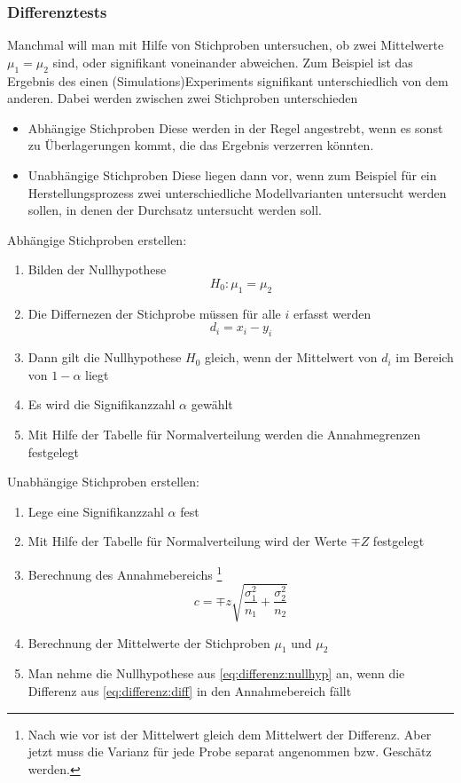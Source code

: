 \subsubsection{Differenztests}
Manchmal will man mit Hilfe von Stichproben untersuchen, ob  zwei Mittelwerte $\mu_1 = \mu_2$ sind, oder signifikant voneinander abweichen. Zum Beispiel ist das Ergebnis des einen (Simulations)Experiments signifikant unterschiedlich von dem anderen.  Dabei werden zwischen zwei Stichproben unterschieden
\begin{itemize}
\item Abhängige Stichproben
\subitem Diese werden in der Regel angestrebt, wenn es sonst zu Überlagerungen kommt, die das Ergebnis verzerren könnten.
\item Unabhängige Stichproben
\subitem Diese liegen dann vor, wenn zum Beispiel für ein Herstellungsprozess zwei unterschiedliche Modellvarianten untersucht werden sollen, in denen der Durchsatz untersucht werden soll.
\end{itemize}
Abhängige Stichproben erstellen:
\begin{enumerate}
\item Bilden der Nullhypothese
\begin{equation}\label{eq:differenz:nullhyp}
H_0: \mu_1 = \mu_2
\end{equation}
\item Die Differnezen der Stichprobe müssen für alle $i$ erfasst werden
\begin{equation}\label{eq:differenz:diff}
d_i = x_i - y_i
\end{equation}
\item Dann gilt die Nullhypothese $H_0$ gleich, wenn der Mittelwert von $d_i$ im Bereich von $1-\alpha$ liegt
\item Es wird die Signifikanzzahl $\alpha$ gewählt
\item Mit Hilfe der Tabelle für Normalverteilung werden die Annahmegrenzen festgelegt
\end{enumerate}
Unabhängige Stichproben erstellen:
\begin{enumerate}
\item Lege eine Signifikanzzahl $\alpha$ fest
\item Mit Hilfe der Tabelle für Normalverteilung wird der Werte $\mp Z$ festgelegt
\item Berechnung des Annahmebereichs
\footnote{Nach wie vor ist der Mittelwert gleich dem Mittelwert der Differenz. Aber jetzt muss die Varianz für jede Probe separat angenommen bzw. Geschätz werden.}
\begin{equation}
c=\mp z\sqrt{\frac{\sigma_1^2}{n_1}+\frac{\sigma_2^2}{n_2}}
\end{equation}

\item Berechnung der Mittelwerte der Stichproben $\mu_1$ und $\mu_2$
\item Man nehme die Nullhypothese aus \autoref{eq:differenz:nullhyp} an, wenn die Differenz aus \autoref{eq:differenz:diff} in den Annahmebereich fällt
\end{enumerate}
